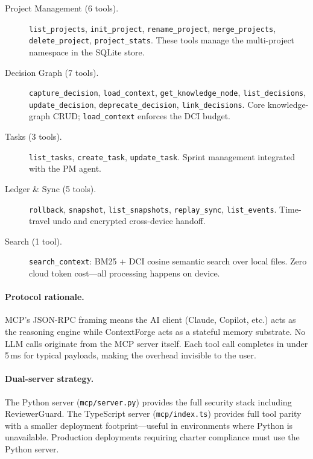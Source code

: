 \documentclass[11pt]{article}
\begin{document}
\begin{description}
  \item[Project Management (6 tools).]
    \texttt{list\_projects}, \texttt{init\_project}, \texttt{rename\_project},
    \texttt{merge\_projects}, \texttt{delete\_project}, \texttt{project\_stats}.
    These tools manage the multi-project namespace in the SQLite store.

  \item[Decision Graph (7 tools).]
    \texttt{capture\_decision}, \texttt{load\_context},
    \texttt{get\_knowledge\_node}, \texttt{list\_decisions},
    \texttt{update\_decision}, \texttt{deprecate\_decision},
    \texttt{link\_decisions}.
    Core knowledge-graph CRUD; \texttt{load\_context} enforces the DCI budget.

  \item[Tasks (3 tools).]
    \texttt{list\_tasks}, \texttt{create\_task}, \texttt{update\_task}.
    Sprint management integrated with the PM agent.

  \item[Ledger \& Sync (5 tools).]
    \texttt{rollback}, \texttt{snapshot}, \texttt{list\_snapshots},
    \texttt{replay\_sync}, \texttt{list\_events}.
    Time-travel undo and encrypted cross-device handoff.

  \item[Search (1 tool).]
    \texttt{search\_context}: BM25 + DCI cosine semantic search over local
    files. Zero cloud token cost---all processing happens on device.
\end{description}

\paragraph{Protocol rationale.}
MCP's JSON-RPC framing means the AI client (Claude, Copilot, etc.) acts as the
reasoning engine while ContextForge acts as a stateful memory substrate.
No LLM calls originate from the MCP server itself. Each tool call completes
in under 5\,ms for typical payloads, making the overhead invisible to the user.

\paragraph{Dual-server strategy.}
The Python server (\texttt{mcp/server.py}) provides the full security stack
including ReviewerGuard. The TypeScript server (\texttt{mcp/index.ts}) provides
full tool parity with a smaller deployment footprint---useful in environments
where Python is unavailable. Production deployments requiring charter compliance
must use the Python server.
\end{document}
